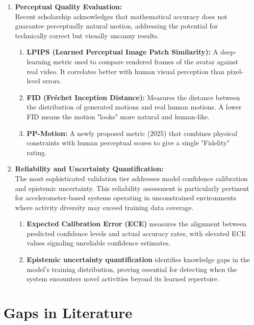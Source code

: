 \documentclass[12pt, a4paper, oneside]{report}
\begin{document}
\begin{enumerate}[leftmargin=*, itemsep=1em, label=\roman*.]
  \item \textbf{Perceptual Quality Evaluation:} \\
    Recent scholarship acknowledges that mathematical accuracy does not guarantee perceptually natural motion, addressing the potential for technically correct but visually uncanny results\cite{zhao2025ppmotion}.
    \begin{enumerate}[leftmargin=*]
        \item \textbf{LPIPS (Learned Perceptual Image Patch Similarity):} A deep-learning metric used to compare rendered frames of the avatar against real video. It correlates better with human visual perception than pixel-level errors.
        \item \textbf{FID (Fréchet Inception Distance):} Measures the distance between the distribution of generated motions and real human motions. A lower FID means the motion "looks" more natural and human-like.
        \item \textbf{PP-Motion:} A newly proposed metric (2025) that combines physical constraints with human perceptual scores to give a single "Fidelity" rating.
  \end{enumerate}

  \item \textbf{Reliability and Uncertainty Quantification:} \\
    The most sophisticated validation tier addresses model confidence calibration and epistemic uncertainty. This reliability assessment is particularly pertinent for accelerometer-based systems operating in unconstrained environments where activity diversity may exceed training data coverage\cite{ponton2025step2motion}.
    \begin{enumerate}[leftmargin=*]
        \item \textbf{Expected Calibration Error (ECE)} measures the alignment between predicted confidence levels and actual accuracy rates, with elevated ECE values signaling unreliable confidence estimates.
        \item \textbf{Epistemic uncertainty quantification} identifies knowledge gaps in the model's training distribution, proving essential for detecting when the system encounters novel activities beyond its learned repertoire.
  \end{enumerate}
\end{enumerate}





\section{Gaps in Literature}
\end{document}
